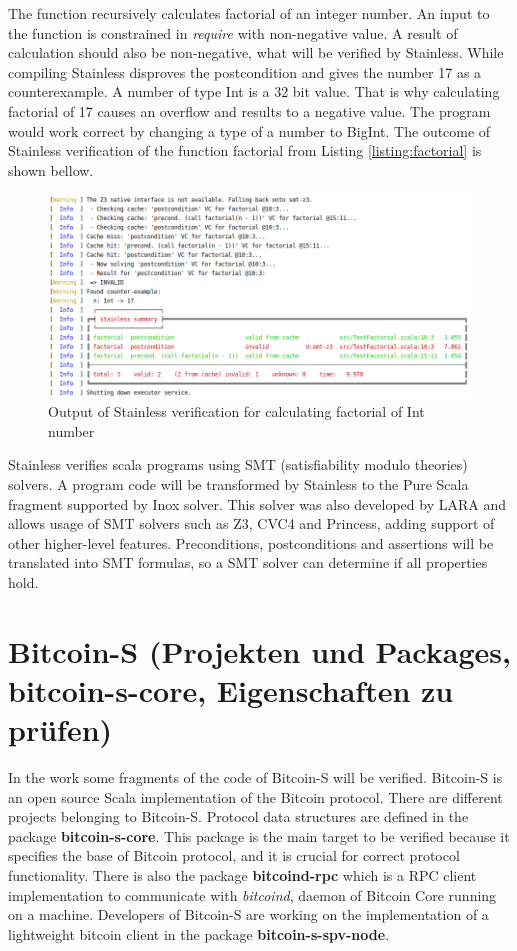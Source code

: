 The function recursively calculates factorial of an integer number. An input to the function is constrained in \textit{require} with non-negative value. A result of calculation should also be non-negative, what will be verified by Stainless.
While compiling Stainless disproves the postcondition and gives the number 17 as a counterexample. A number of type Int is a 32 bit value. That is why calculating factorial of 17 causes an overflow and results to a negative value. The program would work correct by changing a type of a number to BigInt.
The outcome of Stainless verification of the function factorial from Listing \ref{listing:factorial} is shown bellow.

\begin{figure}[H]
	\centering
		\includegraphics[scale=0.5]{images/output1.png}
	\caption{Output of Stainless verification for calculating factorial of Int number}
	\label{fig:output1}
\end{figure}


Stainless verifies scala programs using SMT (satisfiability modulo theories) solvers. A program code will be transformed by Stainless to the Pure Scala fragment supported by Inox solver. 
This solver was also developed by LARA and allows usage of SMT solvers such as Z3, CVC4 and Princess, adding support of other higher-level features.
Preconditions, postconditions and assertions will be translated into SMT formulas, so a SMT solver can determine if all properties hold.


\section{Bitcoin-S (Projekten und Packages, bitcoin-s-core, Eigenschaften zu prüfen)}
\label{sec:bitcoin_s}

In the work some fragments of the code of Bitcoin-S will be verified. Bitcoin-S is an open source Scala implementation of the Bitcoin protocol. 
There are different projects belonging to Bitcoin-S. Protocol data structures are defined in the package \textbf{bitcoin-s-core}. This package is the main target to be verified because it specifies the base of Bitcoin protocol, and it is crucial for correct protocol functionality.
There is also the package \textbf{bitcoind-rpc} which is a RPC client implementation to communicate with \textit{bitcoind}, daemon of Bitcoin Core running on a machine.
Developers of Bitcoin-S are working on the implementation of a lightweight bitcoin client in the package \textbf{bitcoin-s-spv-node}.





